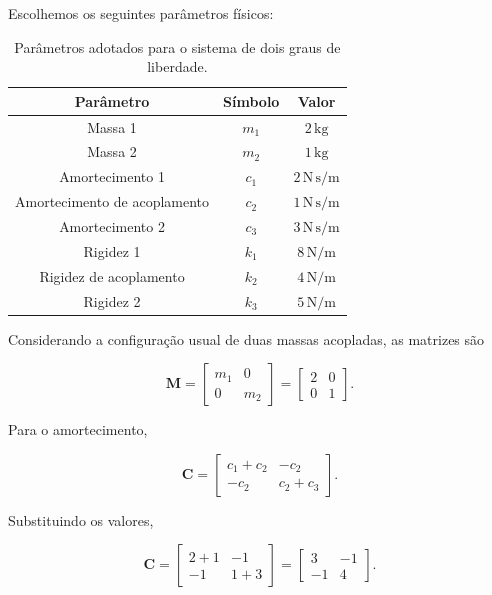 \documentclass[12pt,a4paper]{article}
\begin{document}
Escolhemos os seguintes parâmetros físicos:

\begin{table}[H]
\centering
\begin{tabular}{ccc}
\toprule
Parâmetro & Símbolo & Valor \\
\midrule
Massa 1 & $m_1$ & $2\,\mathrm{kg}$ \\
Massa 2 & $m_2$ & $1\,\mathrm{kg}$ \\
Amortecimento 1 & $c_1$ & $2\,\mathrm{N\,s/m}$ \\
Amortecimento de acoplamento & $c_2$ & $1\,\mathrm{N\,s/m}$ \\
Amortecimento 2 & $c_3$ & $3\,\mathrm{N\,s/m}$ \\
Rigidez 1 & $k_1$ & $8\,\mathrm{N/m}$ \\
Rigidez de acoplamento & $k_2$ & $4\,\mathrm{N/m}$ \\
Rigidez 2 & $k_3$ & $5\,\mathrm{N/m}$ \\
\bottomrule
\end{tabular}
\caption{Parâmetros adotados para o sistema de dois graus de liberdade.}
\end{table}

Considerando a configuração usual de duas massas acopladas, as matrizes são

\begin{equation}
\mathbf{M}
=
\begin{bmatrix}
m_1 & 0\\
0 & m_2
\end{bmatrix}
=
\begin{bmatrix}
2 & 0\\
0 & 1
\end{bmatrix}.
\end{equation}

Para o amortecimento,

\begin{equation}
\mathbf{C}
=
\begin{bmatrix}
c_1+c_2 & -c_2\\
-c_2 & c_2+c_3
\end{bmatrix}.
\end{equation}

Substituindo os valores,

\begin{equation}
\mathbf{C}
=
\begin{bmatrix}
2+1 & -1\\
-1 & 1+3
\end{bmatrix}
=
\boxed{
\begin{bmatrix}
3 & -1\\
-1 & 4
\end{bmatrix}
}.
\end{equation}
\end{document}
